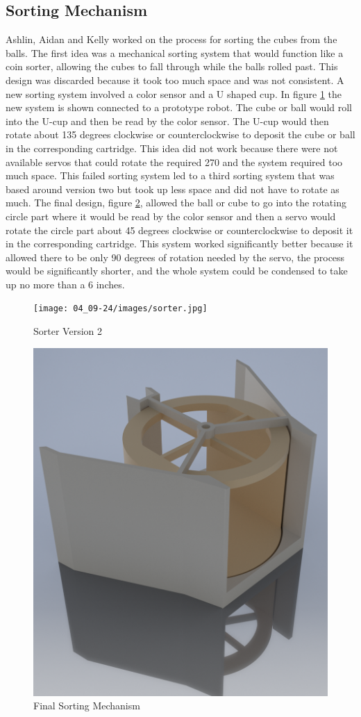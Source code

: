 \documentclass{article}
\newif\ifcontents
\begin{document}
\contentsfalse


\subsection{Sorting Mechanism}
Ashlin, Aidan and Kelly worked on the process for sorting the cubes from the balls. The first idea was a mechanical sorting system that would function like a coin sorter, allowing the cubes to fall through while the balls rolled past. This design was discarded because it took too much space and was not consistent. A new sorting system involved a color sensor and a U shaped cup. In figure \ref{fig:Sorter Version 2} the new system is shown connected to a prototype robot. The cube or ball would roll into the U-cup and then be read by the color sensor. The U-cup would then rotate about 135 degrees clockwise or counterclockwise to deposit the cube or ball in the corresponding cartridge. This idea did not work because there were not available servos that could rotate the required 270 and the system required too much space. This failed sorting system led to a third sorting system that was based around version two but took up less space and did not have to rotate as much. The final design, figure \ref{fig:Final Sorting Mechnism}, allowed the ball or cube to go into the rotating circle part where it would be read by the color sensor and then a servo would rotate the circle part about 45 degrees clockwise or counterclockwise to deposit it in the corresponding cartridge. This system worked significantly better because it allowed there to be only 90 degrees of rotation needed by the servo, the process would be significantly shorter, and the whole system could be condensed to take up no more than a 6 inches.

\begin{figure}
    \centering
    \texttt{[image: 04\_09-24/images/sorter.jpg]}
    \caption{Sorter Version 2}
    \label{fig:Sorter Version 2}
\end{figure}

\begin{figure}
    \centering
    \includegraphics[width=.6\textwidth]{04_09-24/images/sorter2.png}
    \caption{Final Sorting Mechanism}
    \label{fig:Final Sorting Mechnism}
\end{figure}
\end{document}
